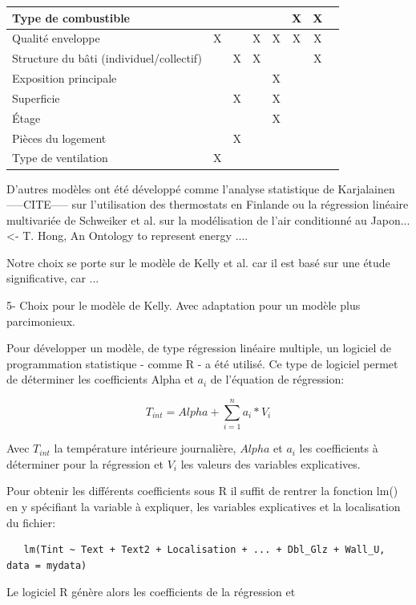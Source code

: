 \begin{table} [H]
\begin{tabular}{|l||c|c|c|c|c|c|c|}
\hline Type de combustible & & & & & X & X & \\
\hline Qualité enveloppe & X & & X & X & X & X & \\
\hline Structure du bâti (individuel/collectif) & & X & X & & & X & \\
\hline Exposition principale & & & & X & & & \\
\hline Superficie & & X & & X & & & \\
\hline Étage & & & & X & & & \\
\hline Pièces du logement & & X & & & & & \\
\hline Type de ventilation & X & & & & & & \\
\hline 
\end{tabular}
\end{table}

D'autres modèles ont été développé comme l'analyse statistique de Karjalainen -----CITE----- sur l'utilisation des thermostats en Finlande ou la régression linéaire multivariée de Schweiker et al. sur la modélisation de l'air conditionné au Japon... <- T. Hong, An Ontology to represent energy ....

Notre choix se porte sur le modèle de Kelly et al. car il est basé sur une étude significative, car ...

5- Choix pour le modèle de Kelly. Avec adaptation pour un modèle plus parcimonieux.

Pour développer un modèle, de type régression linéaire multiple, un logiciel de programmation statistique - comme R - a été utilisé. Ce type de logiciel permet de déterminer les coefficients Alpha et $a_{i}$ de l'équation de régression:

\begin{equation}
T_{int} = Alpha + \sum\limits_{i=1}^n a_{i} * V_{i} 
\end{equation}

Avec $T_{int}$ la température intérieure journalière, $Alpha$ et $a_{i}$ les coefficients à déterminer pour la régression et $V_{i}$ les valeurs des variables explicatives.

Pour obtenir les différents coefficients sous R il suffit de rentrer la fonction lm() en y spécifiant la variable à expliquer, les variables explicatives et la localisation du fichier:
\begin{verbatim}
   lm(Tint ~ Text + Text2 + Localisation + ... + Dbl_Glz + Wall_U, data = mydata)
\end{verbatim}

Le logiciel R génère alors les coefficients de la régression et 

